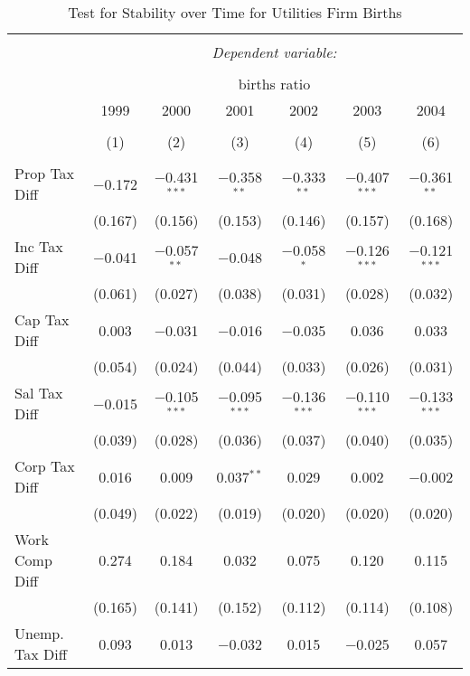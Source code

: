 
\begin{table}[!htbp] \centering 
  \caption{Test for Stability over Time for  Utilities Firm Births} 
  \label{22year} 
\small 
\begin{tabular}{@{\extracolsep{5pt}}lcccccc} 
\\[-1.8ex]\hline 
\hline \\[-1.8ex] 
 & \multicolumn{6}{c}{\textit{Dependent variable:}} \\ 
\cline{2-7} 
\\[-1.8ex] & \multicolumn{6}{c}{births ratio} \\ 
 & 1999 & 2000 & 2001 & 2002 & 2003 & 2004 \\ 
\\[-1.8ex] & (1) & (2) & (3) & (4) & (5) & (6)\\ 
\hline \\[-1.8ex] 
 Prop Tax Diff & $-$0.172 & $-$0.431$^{***}$ & $-$0.358$^{**}$ & $-$0.333$^{**}$ & $-$0.407$^{***}$ & $-$0.361$^{**}$ \\ 
  & (0.167) & (0.156) & (0.153) & (0.146) & (0.157) & (0.168) \\ 
  Inc Tax Diff & $-$0.041 & $-$0.057$^{**}$ & $-$0.048 & $-$0.058$^{*}$ & $-$0.126$^{***}$ & $-$0.121$^{***}$ \\ 
  & (0.061) & (0.027) & (0.038) & (0.031) & (0.028) & (0.032) \\ 
  Cap Tax Diff & 0.003 & $-$0.031 & $-$0.016 & $-$0.035 & 0.036 & 0.033 \\ 
  & (0.054) & (0.024) & (0.044) & (0.033) & (0.026) & (0.031) \\ 
  Sal Tax Diff & $-$0.015 & $-$0.105$^{***}$ & $-$0.095$^{***}$ & $-$0.136$^{***}$ & $-$0.110$^{***}$ & $-$0.133$^{***}$ \\ 
  & (0.039) & (0.028) & (0.036) & (0.037) & (0.040) & (0.035) \\ 
  Corp Tax Diff & 0.016 & 0.009 & 0.037$^{**}$ & 0.029 & 0.002 & $-$0.002 \\ 
  & (0.049) & (0.022) & (0.019) & (0.020) & (0.020) & (0.020) \\ 
  Work Comp Diff & 0.274 & 0.184 & 0.032 & 0.075 & 0.120 & 0.115 \\ 
  & (0.165) & (0.141) & (0.152) & (0.112) & (0.114) & (0.108) \\ 
  Unemp. Tax Diff & 0.093 & 0.013 & $-$0.032 & 0.015 & $-$0.025 & 0.057 \\ 

\end{tabular}
\end{table}
